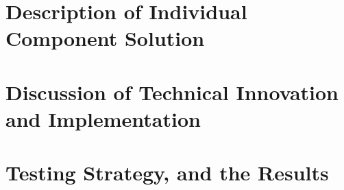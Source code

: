 \section{Description of Individual Component Solution}
\section{Discussion of Technical Innovation and Implementation}
\section{Testing Strategy, and the Results}

